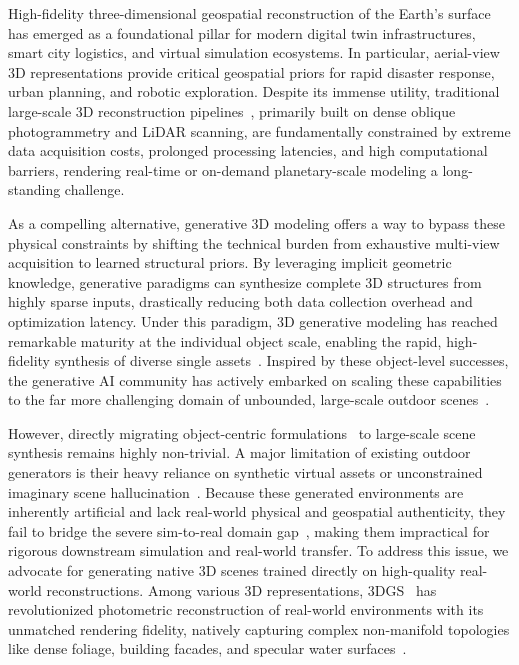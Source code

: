 \documentclass{llmxive}
\begin{document}
High-fidelity three-dimensional geospatial reconstruction of the Earth's surface has emerged as a foundational pillar for modern digital twin infrastructures, smart city logistics, and virtual simulation ecosystems. In particular, aerial-view 3D representations provide critical geospatial priors for rapid disaster response, urban planning, and robotic exploration. Despite its immense utility, traditional large-scale 3D reconstruction pipelines~\cite{schoenberger2016sfm,schoenberger2016mvs,nex2014uav,WEHR199968,shan2018topographic}, primarily built on dense oblique photogrammetry and LiDAR scanning, are fundamentally constrained by extreme data acquisition costs, prolonged processing latencies, and high computational barriers, rendering real-time or on-demand planetary-scale modeling a long-standing challenge.

As a compelling alternative, generative 3D modeling offers a way to bypass these physical constraints by shifting the technical burden from exhaustive multi-view acquisition to learned structural priors. By leveraging implicit geometric knowledge, generative paradigms can synthesize complete 3D structures from highly sparse inputs, drastically reducing both data collection overhead and optimization latency. Under this paradigm, 3D generative modeling has reached remarkable maturity at the individual object scale, enabling the rapid, high-fidelity synthesis of diverse single assets~\cite{xiang2025native,xiang2025structured,CLAY,hunyuan3d22025tencent,lai2025hunyuan3d25highfidelity3d,Seed3D,gao2022get3d,jun2023shapegeneratingconditional3d}. Inspired by these object-level successes, the generative AI community has actively embarked on scaling these capabilities to the far more challenging domain of unbounded, large-scale outdoor scenes~\cite{earthcrafter,CityDreamer,sat2city,lin2023infinicity,sat2scene,Yang_2023_ICCV,Qian_2023_Sat2Density,sat2densitypp,qian2026sat3dgen,infinite_nature_2020}. 

However, directly migrating object-centric formulations~\cite{xiang2025native,xiang2025structured,CLAY,hunyuan3d22025tencent,lai2025hunyuan3d25highfidelity3d,Seed3D} to large-scale scene synthesis remains highly non-trivial. A major limitation of existing outdoor generators is their heavy reliance on synthetic virtual assets or unconstrained imaginary scene hallucination~\cite{Xie_2025_CVPR,CityDreamer,lin2023infinicity,sat2city,sat2scene,earthcrafter}. Because these generated environments are inherently artificial and lack real-world physical and geospatial authenticity, they fail to bridge the severe sim-to-real domain gap~\cite{8202133}, making them impractical for rigorous downstream simulation and real-world transfer. To address this issue, we advocate for generating native 3D scenes trained directly on high-quality real-world reconstructions. Among various 3D representations, 3DGS~\cite{3DGS} has revolutionized photometric reconstruction of real-world environments with its unmatched rendering fidelity, natively capturing complex non-manifold topologies like dense foliage, building facades, and specular water surfaces~\cite{liu2024citygaussian}. 
\end{document}
